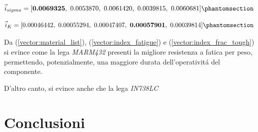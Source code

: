 \documentclass{article}
\begin{document}
        \begin{equation}
            \vec{i}_{sigma} = [\textbf{0.0069325}, \ 0.0053870, \  0.0061420,
             \ 0.0039815, \  0.0060681
            ]
            \phantomsection \label{vector:index_fatigue}
        \end{equation}

        \begin{equation}
            \vec{i}_{K} = [0.00046442,\   0.00055294,\   0.00047407,\
            \textbf{0.00057901},\   0.00039814]
            \phantomsection \label{vector:index_frac_tough}
        \end{equation}

        Da (\ref{vector:material_list}), (\ref{vector:index_fatigue}) e (\ref{vector:index_frac_tough}) si evince come 
        la lega \textit{MARM432} presenti la migliore resistenza a fatica per peso, permettendo, potenzialmente, 
        una maggiore durata dell'operativitá del componente.

        D'altro canto, si evince anche che la lega \textit{IN738LC}

        
        \clearpage


    \section{Conclusioni\label{conclusioni}}

    \clearpage

    \printbibliography
    
\end{document}
